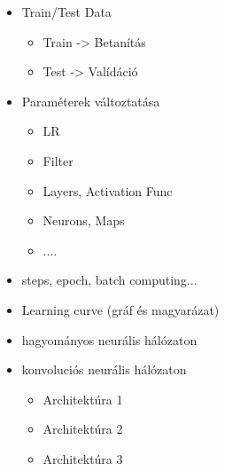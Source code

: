 
\begin{itemize}
\item Train/Test Data
	\begin{itemize}
	\item Train -> Betanítás
	\item Test -> Valídáció	
	\end{itemize}
\end{itemize}

\begin{itemize}
\item Paraméterek változtatása
	\begin{itemize}
	\item LR
	\item Filter
	\item Layers, Activation Func
	\item Neurons, Maps
	\item ....
	\end{itemize}
\item steps, epoch, batch computing...
\item Learning curve (gráf és magyarázat)
\end{itemize}

\begin{itemize}
\item hagyományos neurális hálózaton
\item konvoluciós neurális hálózaton
	\begin{itemize}
	\item Architektúra 1
	\item Architektúra 2
	\item Architektúra 3
	\end{itemize}
\end{itemize}